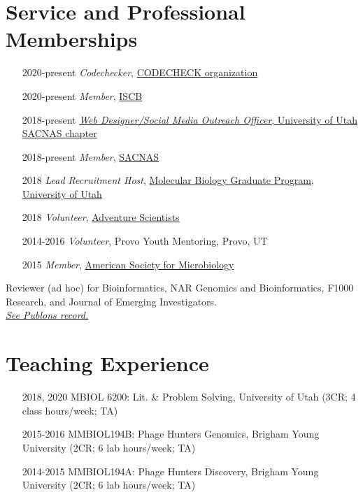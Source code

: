 \documentclass[margin,line]{res}
\begin{document}
\begin{resume}
\section{\sc Service and Professional Memberships}
\begin{itemize}[style=multiline,leftmargin=2.2cm,font=\normalfont]
\item[2020-present] \textit{Codechecker}, \href{https://codecheck.org.uk/}{CODECHECK organization}
\item[2020-present] \textit{Member}, \href{https://www.iscb.org/}{ISCB}
\item[2018-present] \href{https://uofuhealth.utah.edu/sacnas/}{\textit{Web Designer/Social Media Outreach Officer}, University of Utah SACNAS chapter}
\item[2018-present] \textit{Member}, \href{https://www.sacnas.org/}{SACNAS}
\item[2018] \textit{Lead Recruitment Host}, \href{https://bioscience.utah.edu/}{Molecular Biology Graduate Program, University of Utah}
\item[2018] \textit{Volunteer}, \href{https://www.adventurescientists.org/}{Adventure Scientists}
\item[2014-2016] \textit{Volunteer}, Provo Youth Mentoring, Provo, UT
\item[2015] \textit{Member}, \href{https://asm.org/}{American Society for Microbiology}
\end{itemize}

Reviewer (ad hoc) for Bioinformatics, NAR Genomics and Bioinformatics, F1000 Research, and Journal of Emerging Investigators. \\
\hspace*{12pt} \href{https://bit.ly/2DLqcsk}{\textit{See Publons record.}}


\section{\sc Teaching Experience}
\begin{itemize}[style=multiline,leftmargin=2.2cm,font=\normalfont]
\item[2018, 2020] MBIOL 6200: Lit. \& Problem Solving, University of Utah (3CR; 4 class hours/week; TA)
\item[2015-2016] MMBIOL194B: Phage Hunters Genomics, Brigham Young University (2CR; 6 lab hours/week; TA)
\item[2014-2015] MMBIOL194A: Phage Hunters Discovery, Brigham Young University (2CR; 6 lab hours/week; TA)
\end{itemize}



\end{resume}
\end{document}
